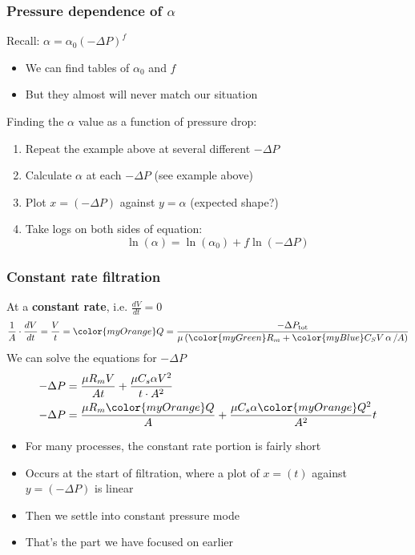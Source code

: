 \begin{frame}\frametitle{Pressure dependence of $\alpha$}
	Recall: $\alpha = \alpha_\text{0} \left(-\Delta P\right)^f$
	\begin{itemize}
		\item	We can find tables of $\alpha_\text{0}$ and $f$
		\item	But they almost will never match our situation
	\end{itemize}
	
	
	\vspace{12pt}
	Finding the $\alpha$ value as a function of pressure drop:
	\begin{enumerate}
		\item	Repeat the example above at several different $-\Delta P$
		\item	Calculate $\alpha$ at each $-\Delta P$ \hfill {\color{myOrange}(see example above)}
		\item	Plot $x=(-\Delta P)$ against $y = \alpha$ \hfill {\color{myOrange}(expected shape?)}
		\item	Take logs on both sides of equation:
		\[
			\ln{\left(\alpha\right)} = \ln{\left(\alpha_\text{0}\right)} + f \ln{\left(-\Delta P\right)}
		\]
	\end{enumerate}
\end{frame}

\begin{frame}\frametitle{Constant rate filtration}
	At a \textbf{constant rate}, i.e. $\frac{dV}{dt} = 0$
	\[ \dfrac{1}{A} \cdot \dfrac{dV}{dt} = \dfrac{V}{t} = {\color{myOrange}Q} = \dfrac{-\Delta P_\text{tot}}{\mu \left({\color{myGreen}R_m} + {\color{myBlue}C_S V  \, \mathbf{ \alpha}\, / A} \right)}	
	\]
	We can solve the equations for $-\Delta P$
	\begin{align*}
		-\Delta P &= \dfrac{\mu R_m V}{A t} + \dfrac{\mu C_s \alpha V^2}{t \cdot A^2}\\
		-\Delta P &= \dfrac{\mu R_m {\color{myOrange}Q}}{A} + \dfrac{\mu C_s \alpha {\color{myOrange}Q^2}}{A^2}t
	\end{align*}
	\begin{itemize}
		\item	For many processes, the constant rate portion is fairly short
		\item	Occurs at the start of filtration, where a plot of $x = (t)$ against $y = (-\Delta P)$ is linear
		\item	Then we settle into constant pressure mode
		\item	That's the part we have focused on earlier
	\end{itemize}
\end{frame}

